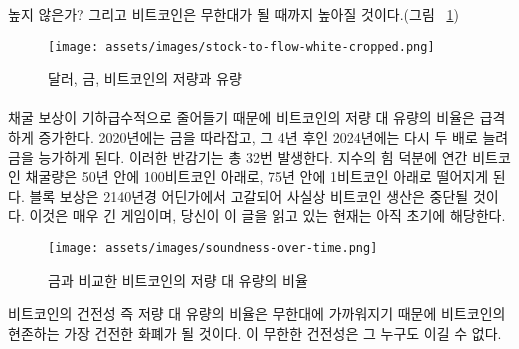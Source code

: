 \begin{comment}	
How high? Well, it turns out that Bitcoin will get infinitely hard (see
Figure~\ref{fig:stock-to-flow-white-cropped}).
\end{comment}
높지 않은가? 그리고 비트코인은 무한대가 될 때까지 높아질 것이다.(그림 ~\ref{fig:stock-to-flow-white-cropped})

\begin{figure}
  \texttt{[image: assets/images/stock-to-flow-white-cropped.png]}
  \caption{달러, 금, 비트코인의 저량과 유량}
  \label{fig:stock-to-flow-white-cropped}
\end{figure}

\paragraph{}
\begin{comment}	
Due to an exponential decrease of the mining reward, the flow of new
bitcoin will diminish resulting in a sky-rocketing stock-to-flow ratio.
It will catch up to gold in 2020, only to surpass it four years later by
doubling its soundness again. Such a doubling will occur 32 times in
total. Thanks to the power of exponentials, the number of bitcoin mined
per year will drop below 100 bitcoin in 50 years and below 1 bitcoin in
75 years. The global faucet which is the block reward will dry up
somewhere around the year 2140, effectively stopping the production of
bitcoin. This is a long game. If you are reading this, you are still
early.
\end{comment}
채굴 보상이 기하급수적으로 줄어들기 때문에 비트코인의 저량 대 유량의 비율은 급격하게 증가한다.
2020년에는 금을 따라잡고, 그 4년 후인 2024년에는 다시 두 배로 늘려 금을 능가하게 된다.
이러한 반감기는 총 32번 발생한다.
지수의 힘 덕분에 연간 비트코인 채굴량은 50년 안에 100비트코인 아래로, 75년 안에 1비트코인 아래로 떨어지게 된다.
블록 보상은 2140년경 어딘가에서 고갈되어 사실상 비트코인 생산은 중단될 것이다. 
이것은 매우 긴 게임이며, 당신이 이 글을 읽고 있는 현재는 아직 초기에 해당한다.

\begin{figure}
  \texttt{[image: assets/images/soundness-over-time.png]}
  \caption{금과 비교한 비트코인의 저량 대 유량의 비율}
  \label{fig:soundness-over-time}
\end{figure}

\begin{comment}	
As bitcoin approaches infinite stock to flow ratio it will be the
soundest money in existence. Infinite soundness is hard to beat.
\end{comment}
비트코인의 건전성 즉 저량 대 유량의 비율은 무한대에 가까워지기 때문에
비트코인의 현존하는 가장 건전한 화폐가 될 것이다.
이 무한한 건전성은 그 누구도 이길 수 없다.

